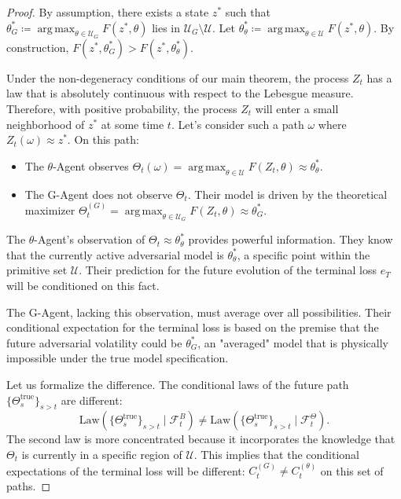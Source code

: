 \documentclass[12pt, letterpaper]{amsart}
\newcommand{\Ucal}{\mathcal{U}}
\DeclareMathOperator*{\argmax}{arg\,max}
\theoremstyle{plain}
\theoremstyle{definition}
\theoremstyle{remark}
\numberwithin{equation}{section} %
\begin{document}
\begin{proof}
By assumption, there exists a state $z^*$ such that $\theta_G^* \coloneqq \argmax_{\theta \in \Ucal_G} F(z^*, \theta)$ lies in $\Ucal_G \setminus \Ucal$. Let $\theta_\theta^* \coloneqq \argmax_{\theta \in \Ucal} F(z^*, \theta)$. By construction, $F(z^*, \theta_G^*) > F(z^*, \theta_\theta^*)$.

Under the non-degeneracy conditions of our main theorem, the process $Z_t$ has a law that is absolutely continuous with respect to the Lebesgue measure. Therefore, with positive probability, the process $Z_t$ will enter a small neighborhood of $z^*$ at some time $t$. Let's consider such a path $\omega$ where $Z_t(\omega) \approx z^*$.
On this path:
\begin{itemize}
    \item The $\theta$-Agent observes $\Theta_t(\omega) = \argmax_{\theta \in \Ucal} F(Z_t, \theta) \approx \theta_\theta^*$.
    \item The G-Agent does not observe $\Theta_t$. Their model is driven by the theoretical maximizer $\Theta_t^{(G)} = \argmax_{\theta \in \Ucal_G} F(Z_t, \theta) \approx \theta_G^*$.
\end{itemize}

The $\theta$-Agent's observation of $\Theta_t \approx \theta_\theta^*$ provides powerful information. They know that the currently active adversarial model is $\theta_\theta^*$, a specific point within the primitive set $\Ucal$. Their prediction for the future evolution of the terminal loss $e_T$ will be conditioned on this fact.

The G-Agent, lacking this observation, must average over all possibilities. Their conditional expectation for the terminal loss is based on the premise that the future adversarial volatility could be $\theta_G^*$, an "averaged" model that is physically impossible under the true model specification.

Let us formalize the difference. The conditional laws of the future path $\{\Theta_s^{\text{true}}\}_{s>t}$ are different:
\[ \mathrm{Law}(\{\Theta_s^{\text{true}}\}_{s>t} \mid \mathcal{F}_t^B) \neq \mathrm{Law}(\{\Theta_s^{\text{true}}\}_{s>t} \mid \mathcal{F}_t^\Theta). \]
The second law is more concentrated because it incorporates the knowledge that $\Theta_t$ is currently in a specific region of $\Ucal$. This implies that the conditional expectations of the terminal loss will be different: $C_t^{(G)} \neq C_t^{(\theta)}$ on this set of paths.


\end{proof}
\end{document}

